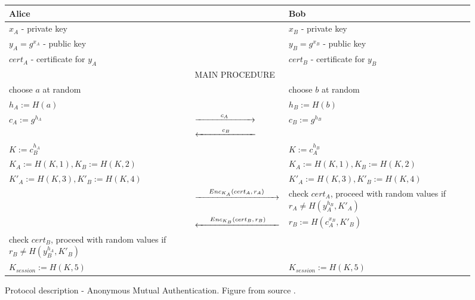 \documentclass[11pt,titlepage]{article}
\theoremstyle{plain}
\begin{document}
\newcommand{\newCA}{$c_A$}
\newcommand{\newCB}{$c_B$}
\newcommand{\newEncA}{$Enc_{K_A}(cert_A,r_A)$}
\newcommand{\newEncB}{$Enc_{K_B}(cert_B,r_B)$}
\begin{figure}[H]

\begin{table}[H]
	\centering
	\begin{tabular}{ | p{6.5cm} p{3.5cm} p{6.5cm} | }
		\hline
		Alice &  & Bob \\
		\hline
		$x_A$ - private key & & $x_B$ - private key \\
		$y_A = g^{x_A}$ - public key & & $y_B = g^{x_B}$ - public key \\
		$cert_A$ - certificate for $y_A$ & & $cert_B$ - certificate for $y_B$ \\
		\hline
		& MAIN PROCEDURE & \\
		\hline
		choose $a$ at random & & choose $b$ at random \\
		$h_A := H(a)$ & & $h_B := H(b)$ \\
		$c_A := g^{h_A}$ & $\xrightarrow{\text{\hspace{1cm}\text{\newCA}\hspace{1cm}}}$ & $c_B := g^{h_B}$ \\
		& $\xleftarrow{\text{\hspace{1cm}\text{\newCB}\hspace{1cm}}}$ & \\
		$K := c^{h_A}_{B}$ & & $K := c_{A}^{h_B}$ \\
		$K_A := H(K,1), K_B := H(K,2)$ & & $K_A := H(K,1), K_B := H(K,2)$  \\
		$K'_A := H(K,3), K'_B := H(K,4)$ & & $K'_A := H(K,3), K'_B := H(K,4)$ \\
		& $\xrightarrow{\text{\hspace{0.5cm}\text{\newEncA}\hspace{0.5cm}}}$ & check $cert_A$, proceed with random values if $r_A \neq H(y_{A}^{h_B}, K'_A)$ \\
		& $\xleftarrow{\text{\hspace{0.5cm}\text{\newEncB}\hspace{0.5cm}}}$ & $r_B := H(c_{A}^{x_B},K'_B)$ \\
		check $cert_B$, proceed with random values if $r_B \neq H(y_{B}^{h_A}, K'_B)$ & & \\
		$K_{session}:= H(K,5)$ & & $K_{session}:= H(K,5)$ \\
		\hline
	\end{tabular}
	\label{tab:singlebest}
		
\end{table}
\caption{Protocol description - Anonymous Mutual Authentication. Figure from source \cite{AMA}.}
\label{fig:F8}
\end{figure}
\end{document}
